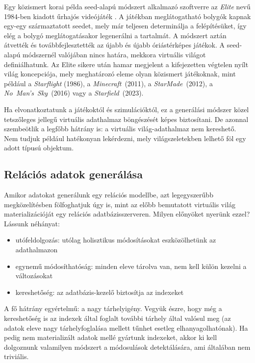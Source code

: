 \documentclass[
    parspace,
    noindent,
    nohyp,
]{elteiktdk}[2023/04/10]
\begin{document}
Egy közismert korai példa seed-alapú módszert alkalmazó szoftverre
az \textit{Elite} nevű 1984-ben kiadott űrhajós videójáték%
\cite{WebsiteElite,SoftwareElite}.
A játékban meglátogatható bolygók kapnak egy-egy származtatott seedet,
mely már teljesen determinálja a felépítésüket,
így elég a bolygó meglátogatásakor legenerálni a tartalmát.
A módszert aztán átvették és továbbfejlesztették az újabb és újabb óriástérképes játékok.
A seed-alapú módszernél valójában nincs határa, mekkora virtuális világot definiálhatunk.
Az Elite sikere után hamar megjelent a kifejezetten végtelen nyílt világ koncepciója,
mely meghatározó eleme olyan közismert játékoknak,
mint például a \textit{Starflight} (1986)\cite{Maher2014Starflight},
a \textit{Minecraft}~(2011)\cite{WebsiteMinecraftSeed},
a \textit{StarMade}~(2012)\cite{WebsiteStarMade},
a \textit{No~Man's~Sky}~(2016)\cite{Khatchadourian2015WorldWithoutEnd}
vagy a \textit{Starfield}~(2023)\cite{Baqery2023Starfield}.

Ha elvonatkoztatunk a játékoktól és szimulációktól,
ez a generálási módszer közel tetszőleges jellegű virtuális adathalmaz böngészését képes biztosítani.
De azonnal szembeötlik a legfőbb hátrány is: a virtuális világ-adathalmaz nem kereshető.
Nem tudjuk például hatékonyan lekérdezni, mely világszeletekben lelhető föl egy adott típusú objektum.

\subsection{Relációs adatok generálása}

Amikor adatokat generálunk egy relációs modellbe, azt legegyszerűbb megközelítésben fölfoghatjuk úgy is,
mint az előbb bemutatott virtuális világ materializációját egy relációs adatbázisszerveren.
Milyen előnyöket nyerünk ezzel? Lássunk néhányat:

\begin{itemize}
    \item utófeldolgozás: utólag holisztikus módosításokat eszközölhetünk az adathalmazon
    \item egynemű módosíthatóság: minden eleve tárolva van, nem kell külön kezelni a változásokat
    \item kereshetőség: az adatbázis-kezelő biztosítja az indexeket
\end{itemize}

A fő hátrány egyértelmű: a nagy tárhelyigény.
Vegyük észre, hogy még a kereshetőség is az indexek által foglalt további tárhely által valósul meg
(az adatok eleve nagy tárhelyfoglalása mellett tűnhet esetleg elhanyagolhatónak).
Ha pedig nem materializált adatok mellé gyártunk indexeket,
akkor ki kell dolgoznunk valamilyen módszert a módosulások detektálására, ami általában nem triviális.
\end{document}
